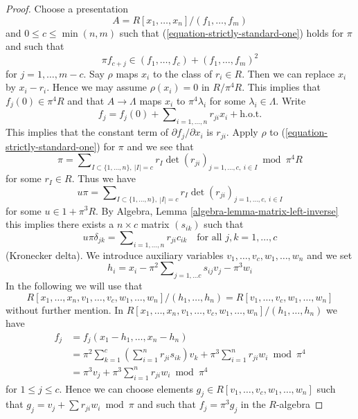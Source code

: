 \begin{proof}
Choose a presentation
$$
A = R[x_1, \ldots, x_n]/(f_1, \ldots, f_m)
$$
and $0 \leq c \leq \min(n, m)$ such that
(\ref{equation-strictly-standard-one}) holds for $\pi$ and such that
\begin{equation}
\label{equation-star}
\pi f_{c + j} \in (f_1, \ldots, f_c) + (f_1, \ldots, f_m)^2
\end{equation}
for $j = 1, \ldots, m - c$. Say $\rho$ maps $x_i$ to the class of
$r_i \in R$. Then we can replace $x_i$ by $x_i - r_i$. Hence we may
assume $\rho(x_i) = 0$ in $R/\pi^4 R$. This implies that
$f_j(0) \in \pi^4R$ and that $A \to \Lambda$ maps $x_i$
to $\pi^4\lambda_i$ for some $\lambda_i \in \Lambda$. Write
$$
f_j = f_j(0) + \sum\nolimits_{i = 1, \ldots, n} r_{ji} x_i + \text{h.o.t.}
$$
This implies that the constant term of $\partial f_j/\partial x_i$ is
$r_{ji}$. Apply $\rho$ to (\ref{equation-strictly-standard-one})
for $\pi$ and we see that
$$
\pi = \sum\nolimits_{I \subset \{1, \ldots, n\},\ |I| = c}
r_I \det(r_{ji})_{j = 1, \ldots, c,\ i \in I} \bmod \pi^4R
$$
for some $r_I \in R$. Thus we have
$$
u\pi = \sum\nolimits_{I \subset \{1, \ldots, n\},\ |I| = c}
r_I \det(r_{ji})_{j = 1, \ldots, c,\ i \in I}
$$
for some $u \in 1 + \pi^3R$. By
Algebra, Lemma \ref{algebra-lemma-matrix-left-inverse}
this implies there exists a $n \times c$ matrix $(s_{ik})$ such that
$$
u\pi \delta_{jk} = \sum\nolimits_{i = 1, \ldots, n} r_{ji}c_{ik}\quad
\text{for all } j, k = 1, \ldots, c
$$
(Kronecker delta). We introduce auxiliary variables
$v_1, \ldots, v_c, w_1, \ldots, w_n$ and we set
$$
h_i = x_i - \pi^2 \sum\nolimits_{j = 1, \ldots c} s_{ij} v_j - \pi^3 w_i
$$
In the following we will use that
$$
R[x_1, \ldots, x_n, v_1, \ldots, v_c, w_1, \ldots, w_n]/
(h_1, \ldots, h_n) = R[v_1, \ldots, v_c, w_1, \ldots, w_n]
$$
without further mention. In
$R[x_1, \ldots, x_n, v_1, \ldots, v_c, w_1, \ldots, w_n]/
(h_1, \ldots, h_n)$ we have
\begin{align*}
f_j & = f_j(x_1 - h_1, \ldots, x_n - h_n) \\
& =
\pi^2 \sum\nolimits_{k = 1}^c
\left(\sum\nolimits_{i = 1}^n r_{ji} s_{ik}\right) v_k
+
\pi^3 \sum\nolimits_{i = 1}^n r_{ji}w_i \bmod \pi^4 \\
& =
\pi^3 v_j + \pi^3 \sum\nolimits_{i = 1}^n r_{ji}w_i \bmod \pi^4
\end{align*}
for $1 \leq j \leq c$. Hence we can choose elements
$g_j \in R[v_1, \ldots, v_c, w_1, \ldots, w_n]$
such that $g_j = v_j + \sum r_{ji}w_i \bmod \pi$
and such that $f_j = \pi^3 g_j$ in the $R$-algebra

\end{proof}
